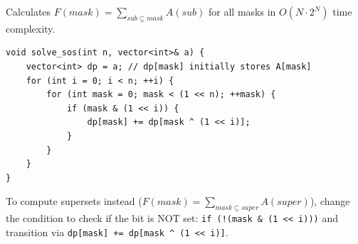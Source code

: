
Calculates $F(mask) = \sum_{sub \subseteq mask} A(sub)$ for all masks in $O(N \cdot 2^N)$ time complexity.

\begin{lstlisting}
void solve_sos(int n, vector<int>& a) {
    vector<int> dp = a; // dp[mask] initially stores A[mask]
    for (int i = 0; i < n; ++i) {
        for (int mask = 0; mask < (1 << n); ++mask) {
            if (mask & (1 << i)) {
                dp[mask] += dp[mask ^ (1 << i)];
            }
        }
    }
}
\end{lstlisting}

To compute supersets instead ($F(mask) = \sum_{mask \subseteq super} A(super)$), change the condition to check if the bit is NOT set: \lstinline|if (!(mask & (1 << i)))| and transition via \lstinline|dp[mask] += dp[mask ^ (1 << i)]|.
